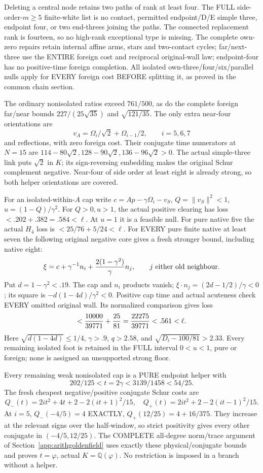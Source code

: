 \documentclass[11pt]{article}
\begin{document}
Deleting a central node retains two paths
of rank at least four.
The FULL side-order-\(m\ge5\) finite-white
list is no contact, permitted endpoint/D/E
simple three, endpoint four, or two end-threes
joining the paths.
The connected replacement rank is fourteen,
so no high-rank exceptional type is missing.
The complete own-zero repairs retain internal
affine arms, stars and two-contact cycles;
far/next-three use the ENTIRE foreign cost
and reciprocal original-wall law;
endpoint-four has no positive-time foreign
completion.
All isolated own-three/four/six/parallel nulls
apply for EVERY foreign cost BEFORE splitting it,
as proved in the common chain section.

The ordinary nonisolated ratios exceed \(761/500\),
as do the complete foreign far/near bounds
\(227/(25\sqrt{35})\) and \(\sqrt{121/35}\).
The only extra near-four orientations are
\[
                   v_A=\Omega_i/\sqrt2+\Omega_{i-1}/2,
                         \qquad i=5,6,7
\]
and reflections, with zero foreign cost.
Their conjugate time numerators at \(N=15\)
are
\(114-80\sqrt2,128-90\sqrt2,136-96\sqrt2>0\).
The actual simple-three link puts \(\sqrt2\)
in \(K\); its sign-reversing embedding makes
the original Schur complement negative.
Near-four of side order at least eight is
already strong, so both helper orientations
are covered.

For an isolated-within-\(A\) cap write
\(c=Ap-\gamma\Omega_i-v_S\),
\(Q=\|v_S\|^2<1\), \(u=(1-Q)/\gamma^2\).
For \(Q>0,u>1\), the actual positive clearing
has loss \(<.202+.382=.584<\ell\).
At \(u=1\) it is a feasible null.
For pure native five the actual \(H_4\)
loss is \(<25/76+5/24<\ell\).
For EVERY pure finite native at least seven
the following original negative core gives
a fresh stronger bound, including native eight:
\[
 \xi=c+\gamma^{-1}n_i+
                    {2(1-\gamma^2)\over\gamma}n_j,
 \qquad j\text{ either old neighbour}.
\]
Put \(d=1-\gamma^2<.19\).
The cap and \(n_i\) products vanish;
\(\xi\cdot n_j=(2d-1/2)/\gamma<0\);
its square is \(-d(1-4d)/\gamma^2<0\).
Positive cap time and actual acuteness check
EVERY omitted original wall.
Its normalized comparison gives loss
\[
 <{10000\over39771}+{25\over81}
       ={22275\over39771}<.561<\ell .
\]
Here \(\sqrt{d(1-4d)}\le1/4\),
\(\gamma>.9\), \(q>2.58\), and
\(\sqrt{D_i-100/81}>2.33\).
Every remaining isolated foot is retained in
the FULL interval \(0<u<1\), pure or foreign;
none is assigned an unsupported strong floor.

Every remaining weak nonisolated cap is a PURE
endpoint helper with
\[
 202/125<t=2\gamma<3139/1458<54/25.
\]
The fresh cheapest negative/positive conjugate
Schur costs are
\[
 Q_-(t)=2it^2+4t+2-2(it+1)^2/15,\quad
 Q_+(t)=2it^2+2-2(it-1)^2/15 .
\]
At \(i=5\), \(Q_-(-4/5)=4\) EXACTLY,
\(Q_+(12/25)=4+16/375\).
They increase at the relevant signs over the
half-window, so strict positivity gives every
other conjugate in \((-4/5,12/25)\).
The COMPLETE all-degree norm/trace argument
of Section~\ref{app:arithgoldenfield} uses exactly
these physical/conjugate bounds and proves
\(t=\varphi\), actual \(K=\mathbb Q(\varphi)\).
No restriction is imposed in a branch without
a helper.
\end{document}
